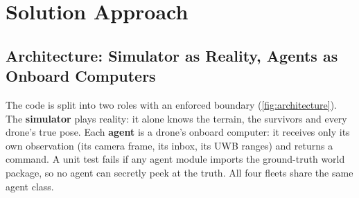 \section{Solution Approach}
\label{sec:solution}

\subsection{Architecture: Simulator as Reality, Agents as Onboard Computers}
\label{sec:architecture}

The code is split into two roles with an enforced boundary (\autoref{fig:architecture}). The \textbf{simulator}
plays reality: it alone knows the terrain, the survivors and every drone's true pose. Each \textbf{agent} is a drone's
onboard computer: it receives only its own observation (its camera frame, its inbox, its UWB ranges) and returns a
command. A unit test fails if any agent module imports the ground-truth world package, so no agent can secretly peek
at the truth. All four fleets share the same agent class.

